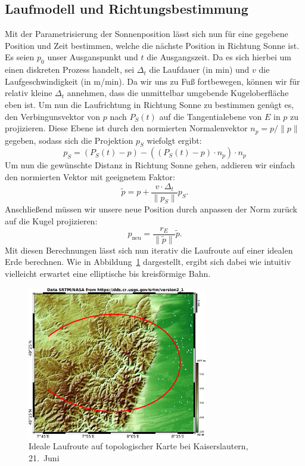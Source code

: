 \documentclass[
    paper=a4,
    DIV14,
    fontsize=12pt,
    pagesize=pdftex,
    toc=bibliographynumbered
]{scrartcl}
\numberwithin{figure}{section}
\numberwithin{equation}{section}
\numberwithin{table}{section}
\begin{document}
\subsection{Laufmodell und Richtungsbestimmung}
Mit der Parametrisierung der Sonnenposition lässt sich nun für eine gegebene Position und
Zeit bestimmen, welche die nächste Position in Richtung Sonne ist. Es seien $p_0$ unser
Ausganspunkt und $t$ die Ausgangszeit. Da es sich hierbei um einen diskreten Prozess
handelt, sei $\Delta_t$ die Laufdauer (in min) und $v$ die Laufgeschwindigkeit (in m/min).
Da wir uns zu Fuß fortbewegen, können wir für relativ kleine $\Delta_t$ annehmen, dass die
unmittelbar umgebende Kugeloberfläche eben ist. Um nun die Laufrichtung in Richtung Sonne
zu bestimmen genügt es, den Verbingunsvektor von $p$ nach $P_S(t)$ auf die Tangentialebene
von $E$ in $p$ zu projizieren. Diese Ebene ist durch den normierten Normalenvektor
$n_p = p/\|p\|$ gegeben, sodass sich die Projektion $p_S$ wiefolgt ergibt:
\begin{equation*}
    p_S = \left( P_S(t) - p \right) - \left( (P_S(t) - p)\cdot n_p \right) \cdot
    n_p
\end{equation*}
Um nun die gewünschte Distanz in Richtung Sonne gehen, addieren wir einfach den normierten
Vektor mit geeignetem Faktor:
\begin{equation*}
    \tilde p = p + \frac{v\cdot\Delta_t}{\|p_S\|} p_S.
\end{equation*}
Anschließend müssen wir unsere neue Position durch anpassen der Norm zurück auf die Kugel
projizieren:
\begin{equation}
    p_{\text{neu}} = \frac{r_E}{\|\tilde p\|}\tilde p.
    \label{eq:pneu}
\end{equation}
Mit diesen Berechnungen lässt sich nun iterativ die Laufroute auf einer idealen Erde
berechnen. Wie in Abbildung~\ref{fig:sonnenmodellroute} dargestellt, ergibt sich dabei wie
intuitiv vielleicht erwartet eine elliptische bis kreisförmige Bahn.

\begin{figure}[ht]
    \centering
    \includegraphics[width=0.7\textwidth]{images/ideal.png}
    \caption{Ideale Laufroute auf topologischer Karte bei Kaiserslautern, 21.\ Juni}
    \label{fig:sonnenmodellroute}
\end{figure}
\end{document}
